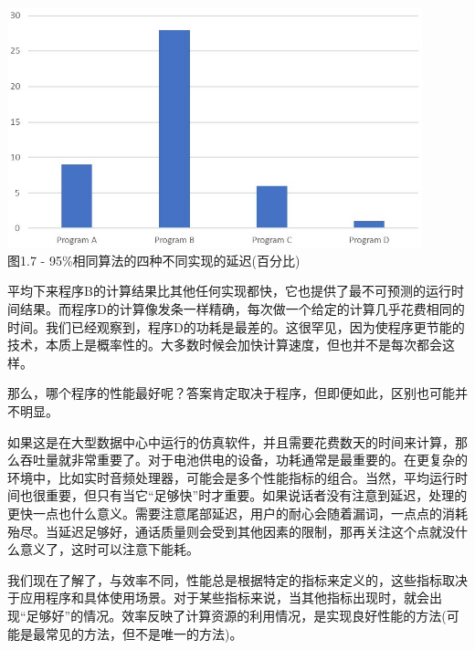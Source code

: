 \begin{center}
\includegraphics[width=0.9\textwidth]{content/1/chapter1/images/7.jpg}\\
图1.7 - 95\%相同算法的四种不同实现的延迟(百分比)
\end{center}

平均下来程序B的计算结果比其他任何实现都快，它也提供了最不可预测的运行时间结果。而程序D的计算像发条一样精确，每次做一个给定的计算几乎花费相同的时间。我们已经观察到，程序D的功耗是最差的。这很罕见，因为使程序更节能的技术，本质上是概率性的。大多数时候会加快计算速度，但也并不是每次都会这样。

那么，哪个程序的性能最好呢？答案肯定取决于程序，但即便如此，区别也可能并不明显。


如果这是在大型数据中心中运行的仿真软件，并且需要花费数天的时间来计算，那么吞吐量就非常重要了。对于电池供电的设备，功耗通常是最重要的。在更复杂的环境中，比如实时音频处理器，可能会是多个性能指标的组合。当然，平均运行时间也很重要，但只有当它“足够快”时才重要。如果说话者没有注意到延迟，处理的更快一点也什么意义。需要注意尾部延迟，用户的耐心会随着漏词，一点点的消耗殆尽。当延迟足够好，通话质量则会受到其他因素的限制，那再关注这个点就没什么意义了，这时可以注意下能耗。

我们现在了解了，与效率不同，性能总是根据特定的指标来定义的，这些指标取决于应用程序和具体使用场景。对于某些指标来说，当其他指标出现时，就会出现“足够好”的情况。效率反映了计算资源的利用情况，是实现良好性能的方法(可能是最常见的方法，但不是唯一的方法)。












